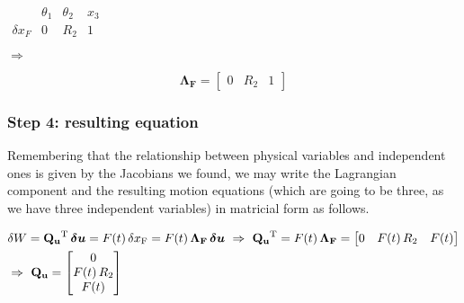 \documentclass[a4paper,12pt,oneside]{article}
\begin{document}
\vspace{30pt}

\begin{minipage}{0.4\textwidth}
	$ \begin{array}{c||c|c|c}
										& \theta_1	& \theta_2	& x_3 \\
		\hline \hline
		\delta x_F	&	0					&	R_2				& 1
	\end{array} $
\end{minipage}
\begin{minipage}{0.1\textwidth}
	$ \Longrightarrow $
\end{minipage}
\begin{minipage}{0.5\textwidth}
	\[
		\mathbf{\Lambda_F} =
		\begin{bmatrix}
			0	& R_2	& 1
		\end{bmatrix}
	\]
\end{minipage}

\vspace{40pt}

\subsubsection*{Step 4: resulting equation}

Remembering that the relationship between physical variables and independent ones is given by the Jacobians we found, we may write the Lagrangian component and the resulting motion equations (which are going to be three, as we have three independent variables) in matricial form as follows.

\[ \begin{split}
	& \delta W = \mathbf{Q_u}^\textup{T} \, \bm{\delta u} =
		F(t) \, \delta x_\textup{F} = F(t) \, \mathbf{\Lambda_F} \, \bm{\delta u}
		~ \Rightarrow ~ \mathbf{Q_u}^\textup{T} = F(t) \, \mathbf{\Lambda_F} =
		\begin{bmatrix}
			0	& F(t) \, R_2	& F(t)
		\end{bmatrix} \\
	& \Rightarrow ~ \mathbf{Q_u} =	\begin{bmatrix}
																		0 \\
																		F(t) \, R_2 \\
																		F(t)
																	\end{bmatrix}
\end{split} \]
\end{document}
